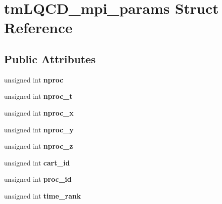 \hypertarget{structtmLQCD__mpi__params}{\section{tm\-L\-Q\-C\-D\-\_\-mpi\-\_\-params Struct Reference}
\label{structtmLQCD__mpi__params}
}
\subsection*{Public Attributes}
\begin{DoxyCompactItemize}
\item 
\hypertarget{structtmLQCD__mpi__params_a4975bbe8b0cfb62e79c0781c490dd63d}{unsigned int {\bfseries nproc}}\label{structtmLQCD__mpi__params_a4975bbe8b0cfb62e79c0781c490dd63d}

\item 
\hypertarget{structtmLQCD__mpi__params_a0a4c04871e365c3860419ca7f24887ab}{unsigned int {\bfseries nproc\-\_\-t}}\label{structtmLQCD__mpi__params_a0a4c04871e365c3860419ca7f24887ab}

\item 
\hypertarget{structtmLQCD__mpi__params_aeca3c4555b51cc3d59523072061a80df}{unsigned int {\bfseries nproc\-\_\-x}}\label{structtmLQCD__mpi__params_aeca3c4555b51cc3d59523072061a80df}

\item 
\hypertarget{structtmLQCD__mpi__params_a84018e237db96ff73a3901804186a9d6}{unsigned int {\bfseries nproc\-\_\-y}}\label{structtmLQCD__mpi__params_a84018e237db96ff73a3901804186a9d6}

\item 
\hypertarget{structtmLQCD__mpi__params_a5ef3417ac401521508fdabd2088ee642}{unsigned int {\bfseries nproc\-\_\-z}}\label{structtmLQCD__mpi__params_a5ef3417ac401521508fdabd2088ee642}

\item 
\hypertarget{structtmLQCD__mpi__params_a4af7dad82b5a76c0ede075c2f752289f}{unsigned int {\bfseries cart\-\_\-id}}\label{structtmLQCD__mpi__params_a4af7dad82b5a76c0ede075c2f752289f}

\item 
\hypertarget{structtmLQCD__mpi__params_a0fd64fdd78ab5028ec4b033386909ed1}{unsigned int {\bfseries proc\-\_\-id}}\label{structtmLQCD__mpi__params_a0fd64fdd78ab5028ec4b033386909ed1}

\item 
\hypertarget{structtmLQCD__mpi__params_adf3515b0f2c1937464fce4d4e558fc0f}{unsigned int {\bfseries time\-\_\-rank}}\label{structtmLQCD__mpi__params_adf3515b0f2c1937464fce4d4e558fc0f}


\end{DoxyCompactItemize}
